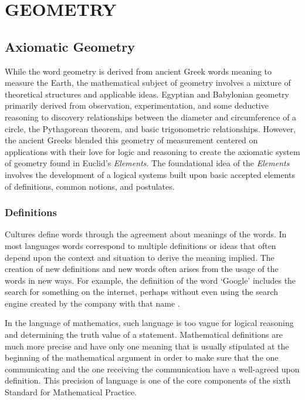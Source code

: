 \documentclass[
]{book}
\theoremstyle{definition}
\theoremstyle{definition}
\theoremstyle{definition}
\theoremstyle{definition}
\theoremstyle{remark}
\begin{document}
\hypertarget{part-geometry}{%
\part{GEOMETRY}\label{part-geometry}}

\hypertarget{ch:constructions}{%
\chapter{Axiomatic Geometry}\label{ch:constructions}}

While the word geometry is derived from ancient Greek words meaning to measure the Earth, the mathematical subject of geometry involves a mixture of theoretical structures and applicable ideas. Egyptian and Babylonian geometry primarily derived from observation, experimentation, and some deductive reasoning to discovery relationships between the diameter and circumference of a circle, the Pythagorean theorem, and basic trigonometric relationships. However, the ancient Greeks blended this geometry of measurement centered on applications with their love for logic and reasoning to create the axiomatic system of geometry found in Euclid's \emph{Elements}. The foundational idea of the \emph{Elements} involves the development of a logical systems built upon basic accepted elements of definitions, common notions, and postulates.

\hypertarget{definitions-1}{%
\section{Definitions}\label{definitions-1}}

Cultures define words through the agreement about meanings of the words. In most languages words correspond to multiple definitions or ideas that often depend upon the context and situation to derive the meaning implied. The creation of new definitions and new words often arises from the usage of the words in new ways. For example, the definition of the word `Google' includes the search for something on the internet, perhaps without even using the search engine created by the company with that name \citep{Edwards2008}.

In the language of mathematics, such language is too vague for logical reasoning and determining the truth value of a statement. Mathematical definitions are much more precise and have only one meaning that is usually stipulated at the beginning of the mathematical argument in order to make sure that the one communicating and the one receiving the communication have a well-agreed upon definition. This precision of language is one of the core components of the sixth Standard for Mathematical Practice.
\end{document}
